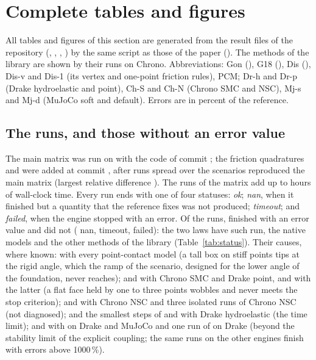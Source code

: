 \section{Complete tables and figures}\label{sup:results}


All tables and figures of this section are generated from the result files of the repository
(, , ,
) by the same script as those of the paper
(). The methods of the library are shown by their runs on Chrono.
Abbreviations: Gon (), G18 (), Dis (), Dis-v
and Dis-1 (its vertex and one-point friction rules), PCM; Dr-h and Dr-p (Drake hydroelastic and
point), Ch-S and Ch-N (Chrono SMC and NSC), Mj-s and Mj-d (MuJoCo soft and default). Errors are
in percent of the reference.

\subsection{The runs, and those without an error value}

The main matrix was run on  with the code of commit
; the friction quadratures and  were added at commit
, after  runs spread over the
scenarios reproduced the main matrix (largest relative difference ).
The runs of the matrix add up to  hours of wall-clock time. Every run
ends with one of four statuses: \emph{ok}; \emph{nan}, when it finished but a quantity that the
reference fixes was not produced; \emph{timeout}; and \emph{failed}, when the engine stopped
with an error. Of the  runs,  finished with an error
value and  did not ( nan, 
timeout,  failed): the two laws have  such
run, the native models  and the other methods of the library
 (Table~\ref{tab:status}). Their causes, where known: 
with every point-contact model (a tall box on stiff points tips at the rigid angle, which the
ramp of the scenario, designed for the lower angle of the foundation, never reaches);
 and  with Chrono SMC and Drake point, and  with the latter
(a flat face held by one to three points wobbles and never meets the stop criterion);
 and  with Chrono NSC and three isolated runs of Chrono NSC (not
diagnosed);  and the smallest steps of  and  with Drake
hydroelastic (the time limit); and  with  on Drake and
MuJoCo and one run of  on Drake (beyond the stability limit of the explicit
coupling; the same runs on the other engines finish with errors above 1000\,\%).

